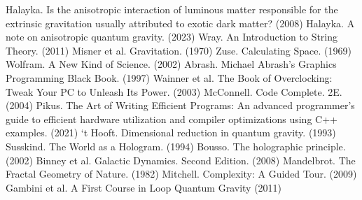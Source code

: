 \documentclass[12pt]{article}
\begin{document}
\begin{thebibliography}{9}

 Halayka. Is the anisotropic interaction of luminous matter responsible for the extrinsic gravitation usually attributed to exotic dark matter? (2008)
 Halayka. A note on anisotropic quantum gravity. (2023)
 Wray. An Introduction to String Theory. (2011)
 Misner et al. Gravitation. (1970)
 Zuse. Calculating Space. (1969)
 Wolfram. A New Kind of Science. (2002)
 Abrash. Michael Abrash's Graphics Programming Black Book. (1997)
 Wainner et al. The Book of Overclocking: Tweak Your PC to Unleash Its Power. (2003)
 McConnell. Code Complete. 2E. (2004)
 Pikus. The Art of Writing Efficient Programs: An advanced programmer's guide to efficient hardware utilization and compiler optimizations using C++ examples. (2021)
 `t Hooft. Dimensional reduction in quantum gravity. (1993)
 Susskind. The World as a Hologram. (1994)
 Bousso. The holographic principle. (2002)
 Binney et al. Galactic Dynamics. Second Edition. (2008)
 Mandelbrot. The Fractal Geometry of Nature. (1982)
 Mitchell. Complexity: A Guided Tour. (2009)
 Gambini et al. A First Course in Loop Quantum Gravity (2011)








\end{thebibliography}
\end{document}
